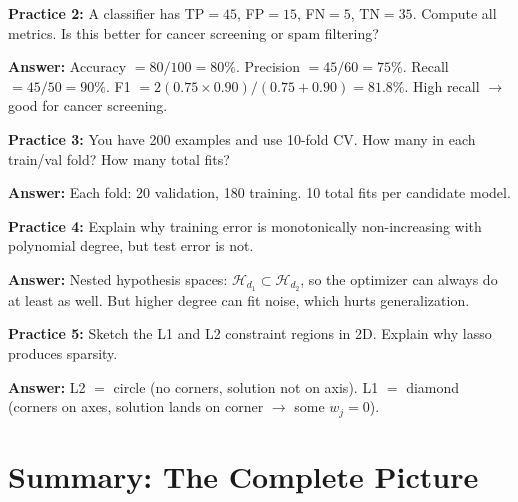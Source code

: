 \documentclass[11pt,a4paper]{article}
\begin{document}
\medskip

\textbf{Practice 2:} A classifier has TP$=45$, FP$=15$, FN$=5$, TN$=35$. Compute all metrics. Is this better for cancer screening or spam filtering?

\noindent\textbf{Answer:} Accuracy $= 80/100 = 80\%$. Precision $= 45/60 = 75\%$. Recall $= 45/50 = 90\%$. F1 $= 2(0.75 \times 0.90)/(0.75+0.90) = 81.8\%$. High recall $\to$ good for cancer screening.

\medskip

\textbf{Practice 3:} You have 200 examples and use 10-fold CV. How many in each train/val fold? How many total fits?

\noindent\textbf{Answer:} Each fold: 20 validation, 180 training. 10 total fits per candidate model.

\medskip

\textbf{Practice 4:} Explain why training error is monotonically non-increasing with polynomial degree, but test error is not.

\noindent\textbf{Answer:} Nested hypothesis spaces: $\mathcal{H}_{d_1} \subset \mathcal{H}_{d_2}$, so the optimizer can always do at least as well. But higher degree can fit noise, which hurts generalization.

\medskip

\textbf{Practice 5:} Sketch the L1 and L2 constraint regions in 2D. Explain why lasso produces sparsity.

\noindent\textbf{Answer:} L2 $=$ circle (no corners, solution not on axis). L1 $=$ diamond (corners on axes, solution lands on corner $\to$ some $w_j = 0$).

\section{Summary: The Complete Picture}
\end{document}
